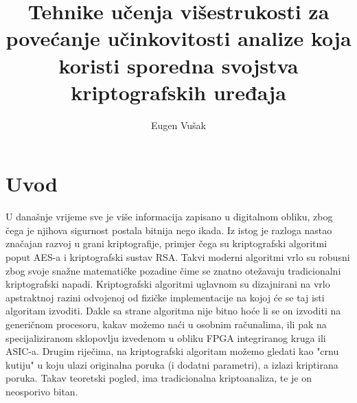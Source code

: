 \documentclass[times, utf8, diplomski]{fer}
\begin{document}

\title{
    Tehnike učenja višestrukosti za povećanje učinkovitosti
    analize koja koristi sporedna svojstva kriptografskih uređaja
}

\author{Eugen Vušak}

\maketitle

\izvornik

\zahvala{}

\tableofcontents


\chapter{Uvod}
U današnje vrijeme sve je više informacija zapisano u digitalnom obliku, zbog čega je njihova sigurnost postala bitnija nego ikada. Iz istog je razloga nastao značajan razvoj u grani kriptografije, primjer čega su kriptografski algoritmi poput AES-a i kriptografski sustav RSA. Takvi moderni algoritmi vrlo su robusni zbog svoje snažne matematičke pozadine čime se znatno otežavaju tradicionalni kriptografski napadi. Kriptografski algoritmi uglavnom su dizajnirani na vrlo apstraktnoj razini odvojenoj od fizičke implementacije na kojoj će se taj isti algoritam izvoditi. Dakle sa strane algoritma nije bitno hoće li se on izvoditi na generičnom procesoru, kakav možemo naći u osobnim računalima, ili pak na specijaliziranom sklopovlju izvedenom u obliku FPGA integriranog kruga ili ASIC-a. Drugim riječima, na kriptografski algoritam možemo gledati kao "crnu kutiju" u koju ulazi originalna poruka (i dodatni parametri), a izlazi kriptirana poruka. Takav teoretski pogled, ima tradicionalna kriptoanaliza, te je on neosporivo bitan.
\end{document}
